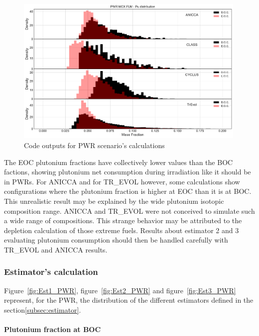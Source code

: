 \begin{figure}[h]
	\begin{center}
		\includegraphics[width = 0.99\textwidth]{../../Feature_1/RAW_DATA/FIG/PWR_MOX_FLM_Pu.pdf}
		\caption{Code outputs for \gls{PWR} scenario's calculations}
		\label{fig:PWR_MOX_FLM_Pu}
	\end{center}
\end{figure}

The \gls{EOC} plutonium fractions have collectively lower values than the \gls{BOC} factions, showing plutonium net consumption during irradiation like it should be in \gls{PWR}s.
For ANICCA and for TR\_EVOL however, some calculations show configurations where the plutonium fraction is higher at \gls{EOC} than it is at \gls{BOC}.
This unrealistic result may be explained by the wide plutonium isotopic composition range.
ANICCA and TR\_EVOL were not conceived to simulate such a wide range
of compositions.
This strange behavior may be attributed to the depletion calculation of those extreme fuels.
Results about estimator 2 and 3 evaluating plutonium consumption should then be handled carefully with TR\_EVOL and ANICCA results.


\subsubsection{Estimator's calculation}

Figure~\ref{fig:Est1_PWR}, figure~\ref{fig:Est2_PWR} and
figure~\ref{fig:Est3_PWR} represent, for the \gls{PWR}, the distribution of the
different estimators defined in the section\ref{subsec:estimator}. 

\paragraph{Plutonium fraction at \gls{BOC}}

